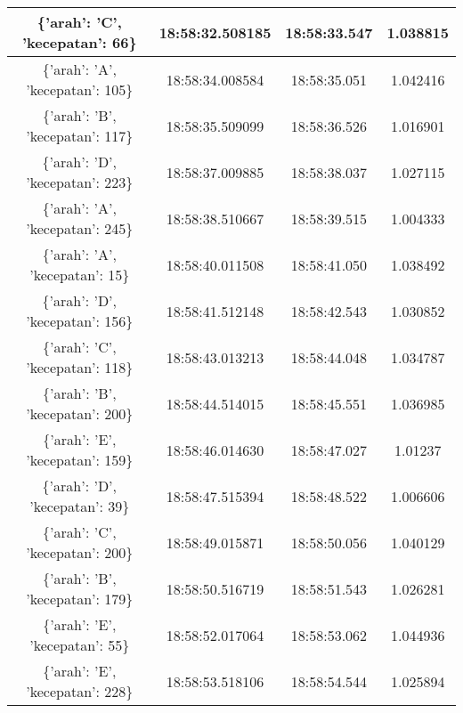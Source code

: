 \begin{longtable}{|ccc|c|}
    \multicolumn{1}{|c|}{\{'arah': 'C', 'kecepatan': 66\}}  & \multicolumn{1}{c|}{18:58:32.508185} & 18:58:33.547       & 1.038815    \\ \hline
    \multicolumn{1}{|c|}{\{'arah': 'A', 'kecepatan': 105\}} & \multicolumn{1}{c|}{18:58:34.008584} & 18:58:35.051       & 1.042416    \\ \hline
    \multicolumn{1}{|c|}{\{'arah': 'B', 'kecepatan': 117\}} & \multicolumn{1}{c|}{18:58:35.509099} & 18:58:36.526       & 1.016901    \\ \hline
    \multicolumn{1}{|c|}{\{'arah': 'D', 'kecepatan': 223\}} & \multicolumn{1}{c|}{18:58:37.009885} & 18:58:38.037       & 1.027115    \\ \hline
    \multicolumn{1}{|c|}{\{'arah': 'A', 'kecepatan': 245\}} & \multicolumn{1}{c|}{18:58:38.510667} & 18:58:39.515       & 1.004333    \\ \hline
    \multicolumn{1}{|c|}{\{'arah': 'A', 'kecepatan': 15\}}  & \multicolumn{1}{c|}{18:58:40.011508} & 18:58:41.050       & 1.038492    \\ \hline
    \multicolumn{1}{|c|}{\{'arah': 'D', 'kecepatan': 156\}} & \multicolumn{1}{c|}{18:58:41.512148} & 18:58:42.543       & 1.030852    \\ \hline
    \multicolumn{1}{|c|}{\{'arah': 'C', 'kecepatan': 118\}} & \multicolumn{1}{c|}{18:58:43.013213} & 18:58:44.048       & 1.034787    \\ \hline
    \multicolumn{1}{|c|}{\{'arah': 'B', 'kecepatan': 200\}} & \multicolumn{1}{c|}{18:58:44.514015} & 18:58:45.551       & 1.036985    \\ \hline
    \multicolumn{1}{|c|}{\{'arah': 'E', 'kecepatan': 159\}} & \multicolumn{1}{c|}{18:58:46.014630} & 18:58:47.027       & 1.01237     \\ \hline
    \multicolumn{1}{|c|}{\{'arah': 'D', 'kecepatan': 39\}}  & \multicolumn{1}{c|}{18:58:47.515394} & 18:58:48.522       & 1.006606    \\ \hline
    \multicolumn{1}{|c|}{\{'arah': 'C', 'kecepatan': 200\}} & \multicolumn{1}{c|}{18:58:49.015871} & 18:58:50.056       & 1.040129    \\ \hline
    \multicolumn{1}{|c|}{\{'arah': 'B', 'kecepatan': 179\}} & \multicolumn{1}{c|}{18:58:50.516719} & 18:58:51.543       & 1.026281    \\ \hline
    \multicolumn{1}{|c|}{\{'arah': 'E', 'kecepatan': 55\}}  & \multicolumn{1}{c|}{18:58:52.017064} & 18:58:53.062       & 1.044936    \\ \hline
    \multicolumn{1}{|c|}{\{'arah': 'E', 'kecepatan': 228\}} & \multicolumn{1}{c|}{18:58:53.518106} & 18:58:54.544       & 1.025894    \\ \hline

\end{longtable}
